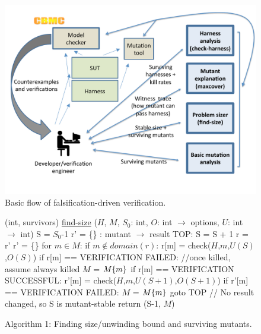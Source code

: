 \documentclass{svjour3}
\begin{document}
\begin{figure}
\includegraphics[width=\columnwidth]{TestFlow}
\caption{Basic flow of falsification-driven verification.}
\label{fig:flow}
\end{figure}

\begin{figure}
{%
\begin{code}
(int, survivors) {\underline{find-size}} ($H$, $M$, $S_0$: int,
                            $O$: int $\rightarrow$ options,
                            $U$: int $\rightarrow$ int) 
\vspace{0.1in}
  S = $S_0$-1 
  r' = \{\} : mutant $\rightarrow$ result
  TOP:
  S = S + 1 
  r = r' 
  r' = \{\}
  for $m \in M$:
     if $m \not\in domain(r)$:
         r[m] = check($H$,$m$,$U(S)$,$O(S)$) 
         if r[m] == VERIFICATION FAILED:
           //once killed, assume always killed 
           $M$ = $M \\ \{m\}$
     if r[m] == VERIFICATION SUCCESSFUL:
        r'[m] = check($H$,$m$,$U(S+1)$,$O(S+1)$) 
        if r'[m] == VERIFICATION FAILED:
           $M$ = $M \\ \{m\}$
           goto TOP 
  // No result changed, so S is mutant-stable 
  return (S-1, $M$) 
\end{code}
}
\caption{Algorithm 1: Finding size/unwinding bound and surviving
  mutants.}
\label{alg:unwind}
\end{figure}
\end{document}
